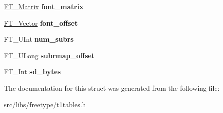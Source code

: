 \begin{DoxyCompactItemize}
\item 
\hypertarget{struct_c_i_d___face_dict_rec___aa418f6ce40b7574b6234e0ab48377e4b}{
\hyperlink{struct_f_t___matrix__}{FT\_\-Matrix} {\bfseries font\_\-matrix}}
\label{struct_c_i_d___face_dict_rec___aa418f6ce40b7574b6234e0ab48377e4b}

\item 
\hypertarget{struct_c_i_d___face_dict_rec___aa62daa8d45ed4a817f1207cbd452d61e}{
\hyperlink{struct_f_t___vector__}{FT\_\-Vector} {\bfseries font\_\-offset}}
\label{struct_c_i_d___face_dict_rec___aa62daa8d45ed4a817f1207cbd452d61e}

\item 
\hypertarget{struct_c_i_d___face_dict_rec___a611c406c8d7cd2e37d077070f4bb3ebe}{
FT\_\-UInt {\bfseries num\_\-subrs}}
\label{struct_c_i_d___face_dict_rec___a611c406c8d7cd2e37d077070f4bb3ebe}

\item 
\hypertarget{struct_c_i_d___face_dict_rec___a45d58111727af70018289e7c5b64ba8c}{
FT\_\-ULong {\bfseries subrmap\_\-offset}}
\label{struct_c_i_d___face_dict_rec___a45d58111727af70018289e7c5b64ba8c}

\item 
\hypertarget{struct_c_i_d___face_dict_rec___aecdf98f9671f22c1715ec929b77767ce}{
FT\_\-Int {\bfseries sd\_\-bytes}}
\label{struct_c_i_d___face_dict_rec___aecdf98f9671f22c1715ec929b77767ce}

\end{DoxyCompactItemize}


The documentation for this struct was generated from the following file:\begin{DoxyCompactItemize}
\item 
src/libs/freetype/t1tables.h\end{DoxyCompactItemize}
